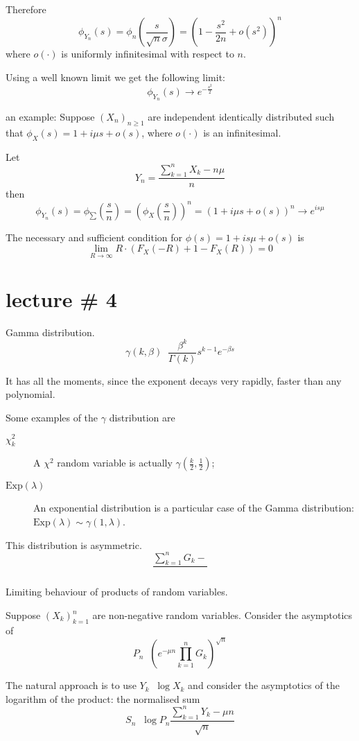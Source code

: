 \documentclass[a4paper]{article}
\newcommand{\brac}[1]{{\left ( #1 \right )}}
\newcommand{\defn}{\mathop{\overset{\Delta}{=}}\nolimits}
\begin{document}
Therefore
\[\phi_{Y_n}(s) = \phi_n(\frac{s}{\sqrt{n}\sigma}) = \brac{ 1 - \frac{s^2}{2n} + o(s^2) }^n\]
where $o(\cdot)$ is uniformly infinitesimal with respect to $n$.

Using a well known limit we get the following limit:
\[\phi_{Y_n}(s) \to e^{-\frac{s^2}{2}}\]

an example:
Suppose $\brac{X_n}_{n\geq1}$ are independent identically distributed such that $\phi_X(s) = 1+i\mu s + o(s)$, where $o(\cdot)$ is an infinitesimal.

Let \[Y_n = \frac{\sum_{k=1}^n X_k - n \mu }{n}\]
then
\[\phi_{Y_n}(s) = \phi_{\sum}(\frac{s}{n})
= \brac{\phi_X(\frac{s}{n})}^n = \brac{1+i\mu s + o(s)}^n
\to e^{is\mu}\]

The necessary and sufficient condition for $\phi(s) = 1+i s\mu+o(s)$ is
\[\lim_{R\to\infty} R\cdot \brac{F_X(-R) + 1 - F_X(R)} = 0\]



\section{lecture \# 4} %
\label{sec:lecture_4}

Gamma distribution.
\[\gamma(k,\beta) \defn \frac{\beta^k}{\Gamma(k)} s^{k-1} e^{-\beta s}\]

It has all the moments, since the exponent decays very rapidly, faster than any polynomial.

Some examples of the $\gamma$ distribution are \begin{description}
	\item[$\chi^2_k$] A $\chi^2$ random variable is actually $\gamma\brac{\frac{k}{2},\frac{1}{2}}$;
	\item[$\text{Exp}(\lambda)$] An exponential distribution is a particular case of the Gamma distribution: $\text{Exp}(\lambda) \sim \gamma(1,\lambda)$.
\end{description}

This distribution is asymmetric.
\[\frac{\sum_{k=1}^n G_k- }{}\]

Limiting behaviour of products of random variables.

Suppose $\brac{X_k}_{k=1}^n$ are non-negative random variables. Consider the asymptotics of \[P_n \defn \brac{e^{-\mu n}\prod_{k=1}^n G_k}^{\sqrt{n}}\]

The natural approach is to use $Y_k\defn \log X_k$ and consider the asymptotics of the logarithm of the product: the normalised sum
\[S_n \defn \log P_n \frac{\sum_{k=1}^n Y_k - \mu n}{\sqrt{n}}\]
\end{document}
